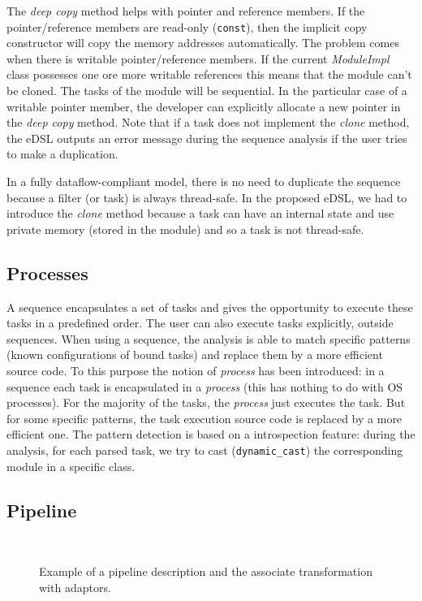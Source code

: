 The \emph{deep copy} method helps with pointer and reference members. If the
pointer/reference members are read-only (\verb|const|), then the implicit copy
constructor will copy the memory addresses automatically. The problem comes
when there is writable pointer/reference members. If the current
\emph{ModuleImpl} class possesses one ore more writable references this means
that the module can't be cloned. The tasks of the module will be sequential. In
the particular case of a writable pointer member, the developer can explicitly
allocate a new pointer in the \emph{deep copy} method. Note that if a task does
not implement the \emph{clone} method, the eDSL outputs an error message during
the sequence analysis if the user tries to make a duplication.

In a fully dataflow-compliant model, there is no need to duplicate the sequence
because a filter (or task) is always thread-safe. In the proposed eDSL, we had
to introduce the \emph{clone} method because a task can have an internal state
and use private memory (stored in the module) and so a task is not thread-safe.

\subsection{Processes}

A sequence encapsulates a set of tasks and gives the opportunity to execute
these tasks in a predefined order. The user can also execute tasks explicitly,
outside sequences. When using a sequence, the analysis is able to match specific
patterns (known configurations of bound tasks) and replace them by a more
efficient source code. To this purpose the notion of \emph{process} has been
introduced: in a sequence each task is encapsulated in a \emph{process} (this
has nothing to do with OS processes). For the majority of the tasks, the
\emph{process} just executes the task. But for some specific patterns, the task
execution source code is replaced by a more efficient one. The pattern detection
is based on a \Cxx introspection feature: during the analysis, for each parsed
task, we try to cast (\verb|dynamic_cast|) the corresponding module in a
specific class.

\subsection{Pipeline}

\begin{figure}[htp]
  \centering
  \\
  \caption{Example of a pipeline description and the associate transformation
    with adaptors.}
  \label{fig:dsl_pipeline}
\end{figure}

